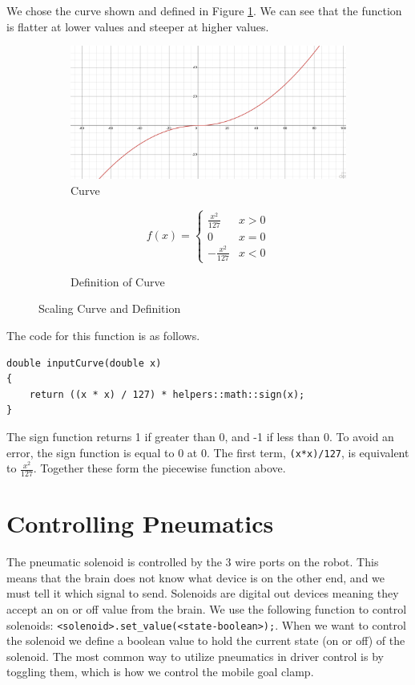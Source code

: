 \documentclass[12pt]{report}
\begin{document}
We chose the curve shown and defined in Figure \ref{FIG::scalCurve}.
We can see that the function is flatter at lower values and steeper at higher values.
\begin{figure}[h]

    \centering
    \begin{subfigure}[][][c]{0.7\textwidth}
        \centering
        \includegraphics[scale=0.25]{figures/scalingCurve.png}
        \caption{Curve}
    \end{subfigure}%
    \begin{subfigure}[][][c]{0.3\textwidth}
        \centering
        $$
        f(x) = 
            \begin{cases}
                \frac{x^2}{127} & x>0 \\
                0 & x=0 \\
                -\frac{x^2}{127} & x<0
            \end{cases}
        $$        
        \caption{Definition of Curve}
    \end{subfigure}

    \label{FIG::scalCurve}
    \caption{Scaling Curve and Definition}

\end{figure}

The code for this function is as follows.
\begin{verbatim}
double inputCurve(double x) 
{
    return ((x * x) / 127) * helpers::math::sign(x);
}
\end{verbatim}
The sign function returns 1 if greater than 0, and -1 if less than 0.
To avoid an error, the sign function is equal to 0 at 0.
The first term, \verb|(x*x)/127|, is equivalent to $\frac{x^2}{127}$.
Together these form the piecewise function above.

\section{Controlling Pneumatics}
The pneumatic solenoid is controlled by the 3 wire ports on the robot.
This means that the brain does not know what device is on the other end,
    and we must tell it which signal to send.
Solenoids are digital out devices meaning they accept an on or off value from the brain.
We use the following function to control solenoids: 
    \verb|<solenoid>.set_value(<state-boolean>);|.
When we want to control the solenoid we define a boolean value to
    hold the current state (on or off) of the solenoid.
The most common way to utilize pneumatics in driver control
    is by toggling them, 
    which is how we control the mobile goal clamp.
\end{document}
